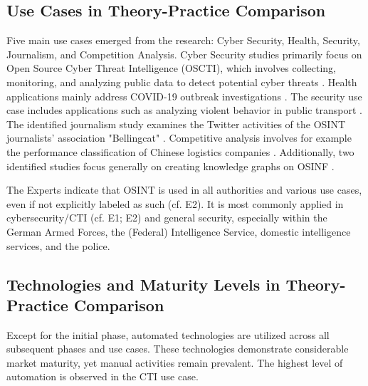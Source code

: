 \documentclass[10pt]{article}
\begin{document}
\subsection{Use Cases in Theory-Practice Comparison}

Five main use cases emerged from the research: Cyber Security, Health, Security, Journalism,
and Competition Analysis. Cyber Security studies primarily focus on Open Source Cyber Threat
Intelligence (OSCTI), which involves collecting, monitoring, and analyzing public
data to detect potential cyber threats \cite{Ahuja.2022,AlDmour.2023}.
Health applications mainly address COVID-19 outbreak investigations \cite{Kpozehouen.2020}.
The security use case includes applications such as
analyzing violent behavior in public transport \cite{Nobili.2021}. The identified journalism study examines the
Twitter activities of the OSINT journalists' association "Bellingcat" \cite{Bar.2023}. Competitive analysis
involves for example the performance classification of Chinese logistics companies \cite{Tao.2023}.
Additionally, two identified studies focus generally on creating knowledge graphs on OSINF \cite{Hu.2023, Ma.2022}.

The Experts indicate that OSINT is used in all authorities and various use cases, even if not explicitly labeled as such (cf. E2). It is most commonly applied in cybersecurity/CTI (cf. E1; E2) and general security, especially within the German Armed Forces, the (Federal) Intelligence Service, domestic intelligence services, and the police.

\subsection{Technologies and Maturity Levels in Theory-Practice Comparison}

Except for the initial phase, automated technologies are utilized across all subsequent phases and use cases.
These technologies demonstrate considerable market maturity, yet manual activities remain prevalent.
The highest level of automation is observed in the CTI use case.
\end{document}
